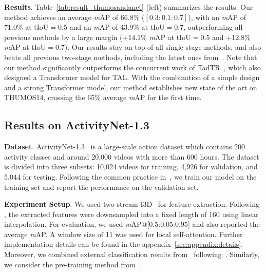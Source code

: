 

\smallskip
\noindent \textbf{Results}. Table~\ref{tab:result_thumosandanet} (left) summarizes the results. Our method achieves an average \textit{m}AP of 66.8\% ($[0.3:0.1:0.7]$), with an \textit{m}AP of 71.0\% at tIoU$=$0.5 and an \textit{m}AP of 43.9\% at tIoU$=$0.7, outperforming all previous methods by a large margin (+14.1\% \textit{m}AP at tIoU$=$0.5 and +12.8\% \textit{m}AP at tIoU$=$0.7). Our results stay on top of all single-stage methods, and also beats all previous two-stage methods, including the latest ones from~\cite{bottumuptaleccv2020,tcanetcvpr2021,ctcnmm2020,csaiccv2021}. Note that our method significantly outperforms the concurrent work of TadTR~\cite{tadtrarxiv2021}, which also designed a Transformer model for TAL. With the combination of a simple design and a strong Transformer model, our method establishes new state of the art on THUMOS14, crossing the 65\% average \textit{m}AP for the first time. 


\subsection{Results on ActivityNet-1.3}\label{sec:exp:anet}

\smallskip
\noindent \textbf{Dataset}.
ActivityNet-1.3~\cite{activitynetcvpr2015} is a large-scale action dataset which contains 200 activity classes and around 20,000 videos with more than 600 hours. The dataset is divided into three subsets: 10,024 videos for training, 4,926 for validation, and 5,044 for testing. Following the common practice in~\cite{bsneccv2018,bmniccv2019,gtadcvpr2020}, we train our model on the training set and report the performance on the validation set. 

\smallskip
\noindent \textbf{Experiment Setup}.
We used two-stream I3D~\cite{kinetics2017cvpr} for feature extraction.%
Following \cite{bsneccv2018,bmniccv2019,gtadcvpr2020}, the extracted features were downsampled into a fixed length of 160 using linear interpolation. For evaluation, we used \textit{m}AP@$[0.5$:$0.05$:$0.95]$ and also reported the average \textit{m}AP. %
A window size of 11 was used for local self-attention. Further implementation details can be found in the appendix~\ref{sec:appendix:details}. Moreover, we combined external classification results from~\cite{anetarxiv2017} following~\cite{bottumuptaleccv2020,gtadcvpr2020,bcgnneccv2020,pgcniccv2019}. Similarly, we consider the pre-training method from~\cite{tspiccvworkshop2021}. %


